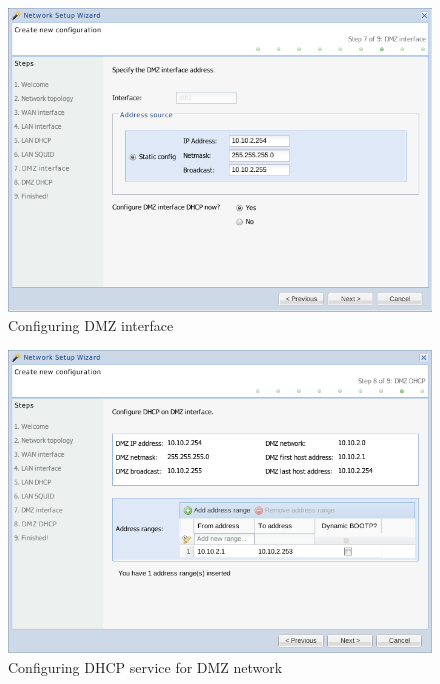 \begin{figure}[H]
    \begin{center}
    \includegraphics[scale=0.38]{screenshots/etfw/etfw_wizard_07.png}
    \caption{Configuring DMZ interface}
    \label{fig:etfw_wizard_passo7}
    \end{center}
\end{figure}

\begin{figure}[H]
    \begin{center}
    \includegraphics[scale=0.38]{screenshots/etfw/etfw_wizard_08.png}
    \caption{Configuring DHCP service for DMZ network}
    \label{fig:etfw_wizard_passo8}
    \end{center}
\end{figure}

